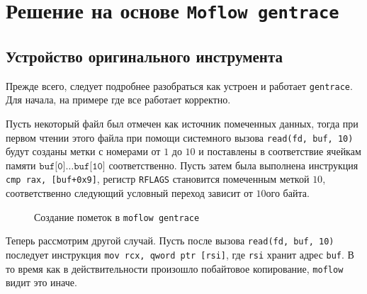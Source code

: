 \chapter{Решение на основе \texttt{Moflow gentrace}}

\section{Устройство оригинального инструмента}

Прежде всего, следует подробнее разобраться как устроен и работает \texttt{gentrace}. Для начала, на примере где все работает корректно.

Пусть некоторый файл был отмечен как источник помеченных данных, тогда при первом чтении этого файла при помощи системного вызова \texttt{read(fd, buf, 10)} будут созданы метки с номерами от $1$ до $10$ и поставлены в соответствие ячейкам памяти $\texttt{buf[0]}\ldots \texttt{buf[10]}$ соответственно. Пусть затем была выполнена инструкция \texttt{cmp rax, [buf+0x9]}, регистр \texttt{RFLAGS} становится помеченным меткой $10$, соответственно следующий условный переход зависит от $10$ого байта.


\begin{figure}[H]
    \caption{Создание пометок в \texttt{moflow gentrace}}
    \label{fig:moflow1}
\end{figure}

Теперь рассмотрим другой случай. Пусть после вызова \texttt{read(fd, buf, 10)} последует инструкция \texttt{mov rcx, qword ptr [rsi]}, где \texttt{rsi} хранит адрес \texttt{buf}. В то время как в действительности произошло побайтовое копирование, \texttt{moflow} видит это иначе.

